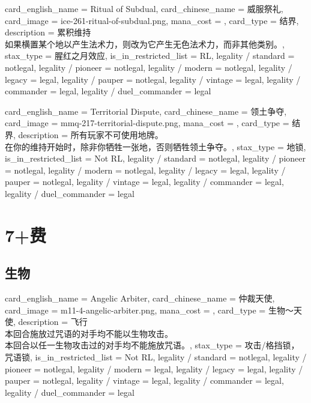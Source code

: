 \documentclass[lang = cn, color = black, 10pt]{AllThatStax}
\begin{document}
\card
{
	card_english_name = {Ritual of Subdual},
	card_chinese_name = {威服祭礼},
	card_image = ice-261-ritual-of-subdual.png,
	mana_cost = ,
	card_type = 结界,
	description = {累积维持\\
如果横置某个地以产生法术力，则改为它产生无色法术力，而非其他类别。},
	stax_type = 腥红之月效应,
	is_in_restricted_list = RL,
	legality / standard = notlegal,
	legality / pioneer = notlegal,
	legality / modern = notlegal,
	legality / legacy = legal,
	legality / pauper = notlegal,
	legality / vintage = legal,
	legality / commander = legal,
	legality / duel_commander = legal
}

\card
{
	card_english_name = {Territorial Dispute},
	card_chinese_name = {领土争夺},
	card_image = mmq-217-territorial-dispute.png,
	mana_cost = ,
	card_type = 结界,
	description = {所有玩家不可使用地牌。\\
在你的维持开始时，除非你牺牲一张地，否则牺牲领土争夺。},
	stax_type = 地锁,
	is_in_restricted_list = Not RL,
	legality / standard = notlegal,
	legality / pioneer = notlegal,
	legality / modern = notlegal,
	legality / legacy = legal,
	legality / pauper = notlegal,
	legality / vintage = legal,
	legality / commander = legal,
	legality / duel_commander = legal
}

\chapter{7+费}

\section{生物}

\card
{
	card_english_name = {Angelic Arbiter},
	card_chinese_name = {仲裁天使},
	card_image = m11-4-angelic-arbiter.png,
	mana_cost = ,
	card_type = 生物～天使,
	description = {飞行\\
本回合施放过咒语的对手均不能以生物攻击。\\
本回合以任一生物攻击过的对手均不能施放咒语。},
	stax_type = 攻击/格挡锁，咒语锁,
	is_in_restricted_list = Not RL,
	legality / standard = notlegal,
	legality / pioneer = notlegal,
	legality / modern = legal,
	legality / legacy = legal,
	legality / pauper = notlegal,
	legality / vintage = legal,
	legality / commander = legal,
	legality / duel_commander = legal
}
\end{document}
